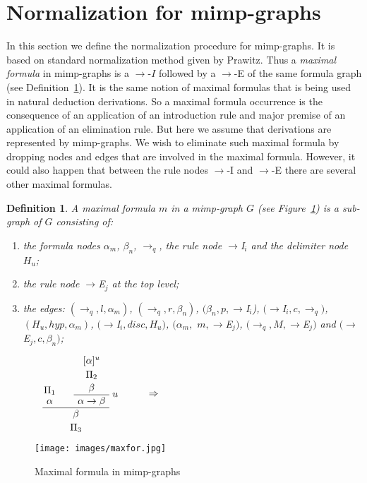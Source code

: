 \documentclass[submission,copyright,creativecommons]{eptcs}
\def\a{\AxiomC}
\def\u{\UnaryInfC}
\def\b{\BinaryInfC}
\newtheorem{definition}{Definition}
\begin{document}
\section{Normalization for mimp-graphs}\label{sec:normal}

In this section we define the normalization procedure for mimp-graphs. It is
based on standard normalization method given by Prawitz. Thus a \emph{maximal formula} in mimp-graphs is a $\rightarrow $-$I$ followed by a $\rightarrow $-E of the same formula graph (see Definition~\ref{maxformula}).
It is the same notion of maximal formulas that is being used in natural
deduction derivations. So a maximal formula occurrence is the consequence of
an application of an introduction rule and major premise of an application
of an elimination rule. But here we assume that derivations are represented
by mimp-graphs. We wish to eliminate such maximal formula by dropping nodes
and edges that are involved in the maximal formula. However, it could also
happen that between the rule nodes $\rightarrow $-I and $\rightarrow $-E
there are several other maximal formulas. 

\begin{definition}
\label{maxformula} A \emph{maximal formula} $m$ in a mimp-graph $G$ (see
Figure~\ref{maxforfig}) is a sub-graph of $G$ consisting of:

\begin{enumerate}
\item  the formula nodes $\alpha_m$, $\beta_n$, $\to_q$, the rule node $\to$I$_i$ and the delimiter node $H_u$;

\item  the rule node $\to$E$_j$ at the top level;

\item  the edges: $(\to_q, l, \alpha_m)$, $(\to_q,r, \beta_n)$, $(\beta_n,
p, \to$I$_i$), $(\to$I$_i, c, \to_q)$, $(H_u, hyp, \alpha_m)$, $(\to$I$_i,
disc, H_u)$, $(\alpha_m,$ $m,\to$E$_j)$, $(\to_q, M, \to$E$_j)$ and $(\to$E$_j, c, \beta_n)$;
\end{enumerate}
\end{definition}

\begin{figure}[h]
\begin{center}
\begin{minipage}{6cm}

 $\begin{array}{lcr}
  \a{$\Pi_1$}
  \noLine
  \u{$\alpha$} 
  \a{$[\alpha]^u$}
  \noLine
  \u{$\Pi_2$}
  \noLine
  \u{$\beta$}\RightLabel{$u$}
  \u{$\alpha\to\beta$}
  \b{$\beta$} 
  \noLine
  \u{$\Pi_3$}
\DisplayProof
\hspace{1cm}\Rightarrow 


\end{array}$  
\end{minipage}
\begin{minipage}{7cm}
\texttt{[image: images/maxfor.jpg]}
\end{minipage}
\caption{Maximal formula in mimp-graphs}
\label{maxforfig}

\end{center}
\end{figure}
\end{document}
